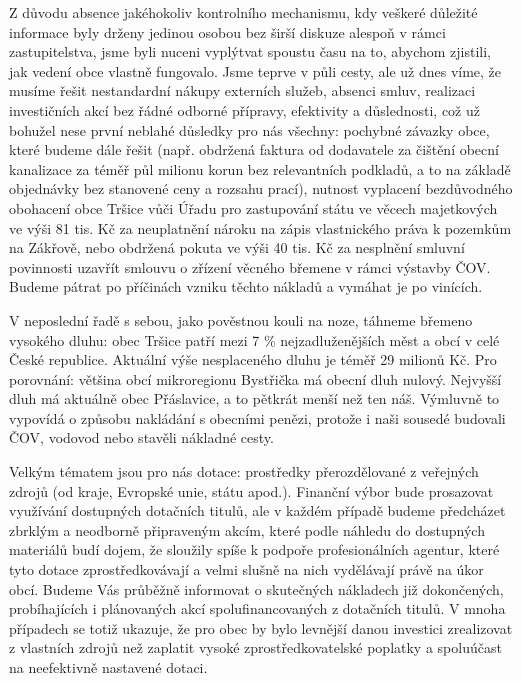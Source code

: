 \documentclass[11pt]{article}
\begin{document}
\begin{multicols}{2}
{Z důvodu absence jakéhokoliv kontrolního mechanismu, kdy veškeré důležité informace byly drženy jedinou osobou bez širší diskuze alespoň v rámci zastupitelstva, jsme byli nuceni vyplýtvat spoustu času na to, abychom zjistili, jak vedení obce vlastně fungovalo. Jsme teprve v půli cesty, ale už dnes víme, že musíme řešit nestandardní nákupy externích služeb, absenci smluv, realizaci investičních akcí bez řádné odborné přípravy, efektivity a důslednosti, což už bohužel nese první neblahé důsledky pro nás všechny: pochybné závazky obce, které budeme dále řešit (např. obdržená faktura od dodavatele za čištění obecní kanalizace za téměř půl milionu korun bez relevantních podkladů, a to na základě objednávky bez stanovené ceny a rozsahu prací), nutnost vyplacení bezdůvodného obohacení obce Tršice vůči Úřadu pro zastupování státu ve věcech majetkových ve výši 81 tis. Kč za neuplatnění nároku na zápis vlastnického práva k pozemkům na Zákřově, nebo obdržená pokuta ve výši 40 tis. Kč za nesplnění smluvní povinnosti uzavřít smlouvu o zřízení věcného břemene v rámci výstavby ČOV. Budeme pátrat po příčinách vzniku těchto nákladů a vymáhat je po vinících.

V neposlední řadě s sebou, jako pověstnou kouli na noze, táhneme břemeno vysokého dluhu: obec Tršice patří mezi 7 \% nejzadluženějších měst a obcí v celé České republice. Aktuální výše nesplaceného dluhu je téměř 29 milionů Kč. Pro porovnání: většina obcí mikroregionu Bystřička má obecní dluh nulový. Nejvyšší dluh má aktuálně obec Přáslavice, a to pětkrát menší než ten náš. Výmluvně to vypovídá o způsobu nakládání s obecními penězi, protože i naši sousedé budovali ČOV, vodovod nebo stavěli nákladné cesty.

Velkým tématem jsou pro nás dotace: prostředky přerozdělované z veřejných zdrojů (od kraje, Evropské unie, státu apod.). Finanční výbor bude prosazovat využívání dostupných dotačních titulů, ale v každém případě budeme předcházet zbrklým a neodborně připraveným akcím, které podle náhledu do dostupných materiálů budí dojem, že sloužily spíše k podpoře profesionálních agentur, které tyto dotace zprostředkovávají a velmi slušně na nich vydělávají právě na úkor obcí. Budeme Vás průběžně informovat o skutečných nákladech již dokončených, probíhajících i plánovaných akcí spolufinancovaných z dotačních titulů. V mnoha případech se totiž ukazuje, že pro obec by bylo levnější danou investici zrealizovat z vlastních zdrojů než zaplatit vysoké zprostředkovatelské poplatky a spoluúčast na neefektivně nastavené dotaci.

}
\end{multicols}
\end{document}

